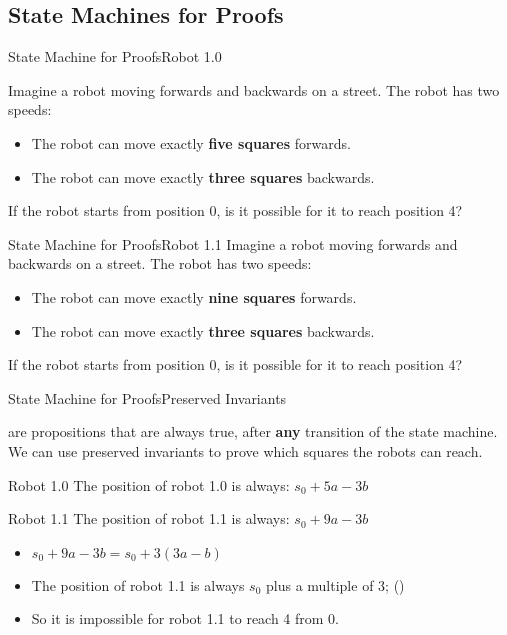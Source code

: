 \subsection{State Machines for Proofs}
\begin{frame}{State Machine for Proofs}{Robot 1.0}

  Imagine a robot moving forwards and backwards on a street. The robot has two speeds:
  \begin{itemize}
    \item The robot can move exactly {\bf five squares} forwards.
    \item The robot can move exactly {\bf three squares} backwards.
  \end{itemize}
  \bigskip

  If the robot starts from position 0, is it possible for it to reach position 4?
\end{frame}

\begin{frame}{State Machine for Proofs}{Robot 1.1}
  Imagine a robot moving forwards and backwards on a street. The robot has two speeds:
  \begin{itemize}
    \item The robot can move exactly {\bf nine squares} forwards.
    \item The robot can move exactly {\bf three squares} backwards.
  \end{itemize}
  \bigskip

  If the robot starts from position 0, is it possible for it to reach position 4?
\end{frame}

\begin{frame}{State Machine for Proofs}{Preserved Invariants}

   are propositions that are always true, after {\bf any} transition of the state machine. We can use preserved invariants to prove which squares the robots can reach.

  \begin{block}{Robot 1.0}
    The position of robot 1.0 is always: $s_0 + 5a - 3b$
  \end{block}
  \begin{block}{Robot 1.1}
    The position of robot 1.1 is always: $s_0 + 9a - 3b$
    \begin{itemize}
      \item $s_0 + 9a - 3b = s_0 + 3(3a-b)$
      \item The position of robot 1.1 is always $s_0$ plus a multiple of 3; ()
      \item So it is impossible for robot 1.1 to reach 4 from 0.
    \end{itemize}
  \end{block}
\end{frame}



